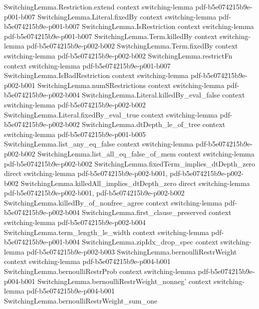 \begin{theorem}
\proofstep
  {SwitchingLemma.Restriction.extend}
  {context}
  {switching-lemma}
  {pdf-b5e074215b9e-p001-b007}
\proofstep
  {SwitchingLemma.Literal.fixedBy}
  {context}
  {switching-lemma}
  {pdf-b5e074215b9e-p001-b007}
\proofstep
  {SwitchingLemma.IsRestriction}
  {context}
  {switching-lemma}
  {pdf-b5e074215b9e-p001-b007}
\proofstep
  {SwitchingLemma.Term.killedBy}
  {context}
  {switching-lemma}
  {pdf-b5e074215b9e-p002-b002}
\proofstep
  {SwitchingLemma.Term.fixedBy}
  {context}
  {switching-lemma}
  {pdf-b5e074215b9e-p002-b002}
\proofstep
  {SwitchingLemma.restrictFn}
  {context}
  {switching-lemma}
  {pdf-b5e074215b9e-p001-b007}
\proofstep
  {SwitchingLemma.IsBadRestriction}
  {context}
  {switching-lemma}
  {pdf-b5e074215b9e-p002-b001}
\proofstep
  {SwitchingLemma.numSRestrictions}
  {context}
  {switching-lemma}
  {pdf-b5e074215b9e-p002-b004}
\proofstep
  {SwitchingLemma.Literal.killedBy_eval_false}
  {context}
  {switching-lemma}
  {pdf-b5e074215b9e-p002-b002}
\proofstep
  {SwitchingLemma.Literal.fixedBy_eval_true}
  {context}
  {switching-lemma}
  {pdf-b5e074215b9e-p002-b002}
\proofstep
  {SwitchingLemma.dtDepth_le_of_tree}
  {context}
  {switching-lemma}
  {pdf-b5e074215b9e-p001-b005}
\proofstep
  {SwitchingLemma.list_any_eq_false}
  {context}
  {switching-lemma}
  {pdf-b5e074215b9e-p002-b002}
\proofstep
  {SwitchingLemma.list_all_eq_false_of_mem}
  {context}
  {switching-lemma}
  {pdf-b5e074215b9e-p002-b002}
\proofstep
  {SwitchingLemma.fixedTerm_implies_dtDepth_zero}
  {direct}
  {switching-lemma}
  {pdf-b5e074215b9e-p002-b001,
    pdf-b5e074215b9e-p002-b002}
\proofstep
  {SwitchingLemma.killedAll_implies_dtDepth_zero}
  {direct}
  {switching-lemma}
  {pdf-b5e074215b9e-p002-b001,
    pdf-b5e074215b9e-p002-b002}
\proofstep
  {SwitchingLemma.killedBy_of_nonfree_agree}
  {context}
  {switching-lemma}
  {pdf-b5e074215b9e-p002-b004}
\proofstep
  {SwitchingLemma.first_clause_preserved}
  {context}
  {switching-lemma}
  {pdf-b5e074215b9e-p002-b004}
\proofstep
  {SwitchingLemma.term_length_le_width}
  {context}
  {switching-lemma}
  {pdf-b5e074215b9e-p001-b004}
\proofstep
  {SwitchingLemma.zipIdx_drop_spec}
  {context}
  {switching-lemma}
  {pdf-b5e074215b9e-p002-b003}
\proofstep
  {SwitchingLemma.bernoulliRestrWeight}
  {context}
  {switching-lemma}
  {pdf-b5e074215b9e-p004-b001}
\proofstep
  {SwitchingLemma.bernoulliRestrProb}
  {context}
  {switching-lemma}
  {pdf-b5e074215b9e-p004-b001}
\proofstep
  {SwitchingLemma.bernoulliRestrWeight_nonneg'}
  {context}
  {switching-lemma}
  {pdf-b5e074215b9e-p004-b001}
\proofstep
  {SwitchingLemma.bernoulliRestrWeight_sum_one}

\end{theorem}
